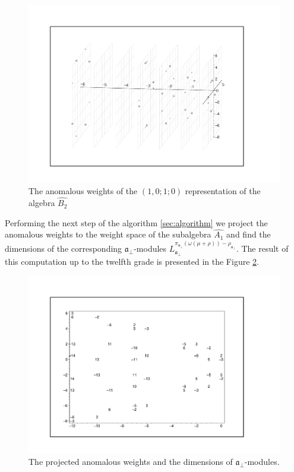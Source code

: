 \documentclass[a4paper,12pt]{article}
\theoremstyle{definition} \newtheorem{Def}{Definition}
\begin{document}
\begin{figure}[h!tb]
  \includegraphics[width=160mm]{AffineB2_A1_Anom.pdf}
  \caption{The anomalous weights of the $(1,0;1;0)$ representation of the algebra $\hat{B_2}$}
  \label{fig:affine_B2_anom_point}
\end{figure}

Performing the next step of the algorithm \ref{sec:algorithm} we project the anomalous weights to the weight space of the subalgebra $\hat{A_1}$ and find the dimensions of the corresponding $\mathfrak{a}_{\bot}$-modules $L^{\pi_{\mathfrak{a}_{\bot}}(\omega(\mu+\rho))-\rho_{\mathfrak{a}_{\bot}}}_{\mathfrak{a}_{\bot}}$.
The result of this computation up to the twelfth grade is presented in the Figure
\ref{fig:AffineB2_A1_anom_proj}.
\begin{figure}[p]
  \centering
  \includegraphics[width=120mm]{AffineB2_A1_proj_anom.pdf}
  \caption{The projected anomalous weights and the dimensions of $\mathfrak{a}_{\bot}$-modules.}
  \label{fig:AffineB2_A1_anom_proj}
\end{figure}
\end{document}
